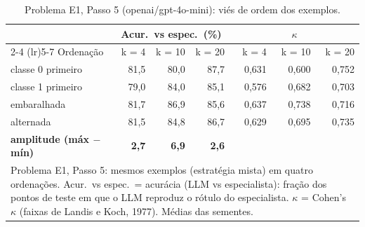 \begin{table}[htbp]
\centering
\small
\caption{Problema E1, Passo 5 (openai/gpt-4o-mini): viés de ordem dos exemplos.}
\label{tab:bloco2_E1_passo5_ordem_gpt4mini}
\begin{tabular}{lrrrrrr}
\toprule
 & \multicolumn{3}{c}{Acur.\ vs espec.\ (\%)} & \multicolumn{3}{c}{$\kappa$} \\ \cmidrule(lr){2-4} \cmidrule(lr){5-7}
Ordenação & k = 4 & k = 10 & k = 20 & k = 4 & k = 10 & k = 20 \\
\midrule
classe 0 primeiro & 81,5 & 80,0 & 87,7 & 0,631 & 0,600 & 0,752 \\
classe 1 primeiro & 79,0 & 84,0 & 85,1 & 0,576 & 0,682 & 0,703 \\
embaralhada & 81,7 & 86,9 & 85,6 & 0,637 & 0,738 & 0,716 \\
alternada & 81,5 & 84,8 & 86,7 & 0,629 & 0,695 & 0,735 \\
\midrule
\textbf{amplitude (máx $-$ mín)} & \textbf{2,7} & \textbf{6,9} & \textbf{2,6} &  &  &  \\
\bottomrule
\multicolumn{7}{p{0.95\linewidth}}{\footnotesize Problema E1, Passo 5: mesmos exemplos (estratégia mista) em quatro ordenações. Acur.\ vs espec.\ = acurácia (LLM vs especialista): fração dos pontos de teste em que o LLM reproduz o rótulo do especialista. $\kappa$ = Cohen's $\kappa$ (faixas de Landis e Koch, 1977). Médias das sementes.} \\
\end{tabular}
\end{table}
